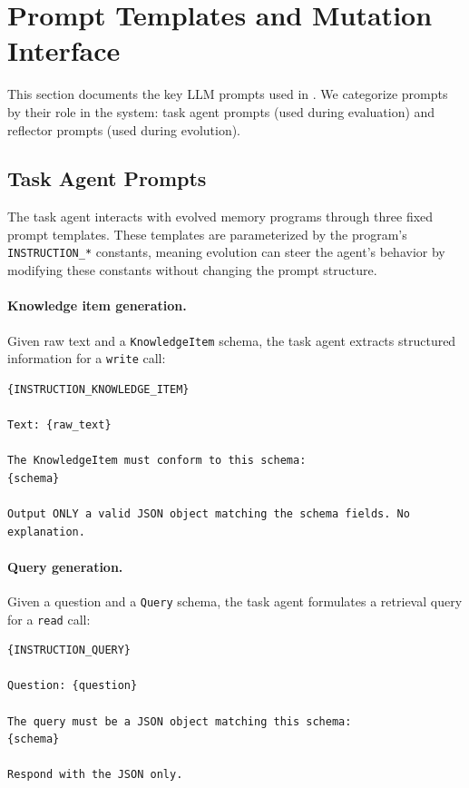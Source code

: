 \FloatBarrier



\section{Prompt Templates and Mutation Interface}
\label{app:prompts}

This section documents the key LLM prompts used in \sysname{}.
We categorize prompts by their role in the system: task agent prompts (used during evaluation) and reflector prompts (used during evolution).

\subsection{Task Agent Prompts}
\label{app:task-agent-prompts}

The task agent interacts with evolved memory programs through three fixed prompt templates.
These templates are parameterized by the program's \texttt{INSTRUCTION\_*} constants, meaning evolution can steer the agent's behavior by modifying these constants without changing the prompt structure.

\paragraph{Knowledge item generation.}
Given raw text and a \texttt{KnowledgeItem} schema, the task agent extracts structured information for a \texttt{write} call:
\begin{lstlisting}[style=evolvedcode, basicstyle=\ttfamily\scriptsize]
{INSTRUCTION_KNOWLEDGE_ITEM}

Text: {raw_text}

The KnowledgeItem must conform to this schema:
{schema}

Output ONLY a valid JSON object matching the schema fields. No explanation.
\end{lstlisting}

\paragraph{Query generation.}
Given a question and a \texttt{Query} schema, the task agent formulates a retrieval query for a \texttt{read} call:
\begin{lstlisting}[style=evolvedcode, basicstyle=\ttfamily\scriptsize]
{INSTRUCTION_QUERY}

Question: {question}

The query must be a JSON object matching this schema:
{schema}

Respond with the JSON only.
\end{lstlisting}

